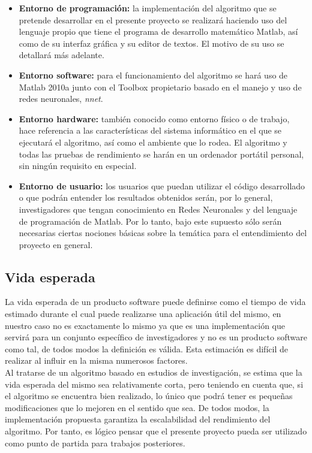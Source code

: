 			\begin{itemize}
				\item \textbf{Entorno de programación:} la implementación del algoritmo que se pretende desarrollar en el presente proyecto se realizará haciendo uso del lenguaje propio que tiene el programa de desarrollo matemático Matlab, así como de su interfaz gráfica y su editor de textos. El motivo de su uso se detallará más adelante.
				\item \textbf{Entorno software:} para el funcionamiento del algoritmo se hará uso de Matlab 2010a junto con el Toolbox propietario basado en el manejo y uso de redes neuronales, \textit{nnet}.
				\item \textbf{Entorno hardware:} también conocido como entorno físico o de trabajo, hace referencia a las características del sistema informático en el que se ejecutará el algoritmo, así como el ambiente que lo rodea. El algoritmo y todas las pruebas de rendimiento se harán en un ordenador portátil personal, sin ningún requisito en especial.
				\item \textbf{Entorno de usuario:} los usuarios que puedan utilizar el código desarrollado o que podrán entender los resultados obtenidos serán, por lo general, investigadores que tengan conocimiento en Redes Neuronales y del lenguaje de programación de Matlab. Por lo tanto, bajo este supuesto sólo serán necesarias ciertas nociones básicas sobre la temática para el entendimiento del proyecto en general.
			\end{itemize}
		
		\subsection{Vida esperada}
		
			La vida esperada de un producto software puede definirse como el tiempo de vida estimado durante el cual puede realizarse una aplicación útil del mismo, en nuestro caso no es exactamente lo mismo ya que es una implementación que servirá para un conjunto específico de investigadores y no es un producto software como tal, de todos modos la definición es válida. Esta estimación es difícil de realizar al influir en la misma numerosos factores.\\

			Al tratarse de un algoritmo basado en estudios de investigación, se estima que la vida esperada del mismo sea relativamente corta, pero teniendo en cuenta que, si el algoritmo se encuentra bien realizado, lo único que podrá tener es pequeñas modificaciones que lo mejoren en el sentido que sea. De todos modos, la implementación propuesta garantiza la escalabilidad del rendimiento del algoritmo. Por tanto, es lógico pensar que el presente proyecto pueda ser utilizado como punto de partida para trabajos posteriores.
		
